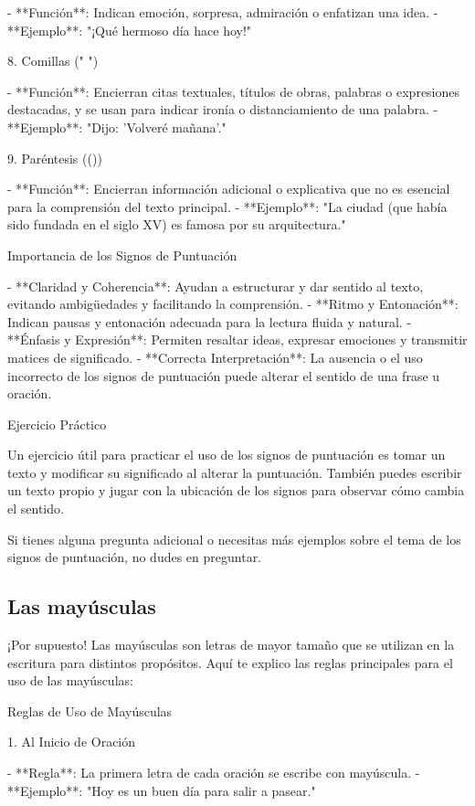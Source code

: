 - **Función**: Indican emoción, sorpresa, admiración o enfatizan una idea.
- **Ejemplo**: "¡Qué hermoso día hace hoy!"

8. Comillas (" ")

- **Función**: Encierran citas textuales, títulos de obras, palabras o expresiones destacadas, y se usan para indicar ironía o distanciamiento de una palabra.
- **Ejemplo**: "Dijo: 'Volveré mañana'."

9. Paréntesis (())

- **Función**: Encierran información adicional o explicativa que no es esencial para la comprensión del texto principal.
- **Ejemplo**: "La ciudad (que había sido fundada en el siglo XV) es famosa por su arquitectura."

Importancia de los Signos de Puntuación

- **Claridad y Coherencia**: Ayudan a estructurar y dar sentido al texto, evitando ambigüedades y facilitando la comprensión.
- **Ritmo y Entonación**: Indican pausas y entonación adecuada para la lectura fluida y natural.
- **Énfasis y Expresión**: Permiten resaltar ideas, expresar emociones y transmitir matices de significado.
- **Correcta Interpretación**: La ausencia o el uso incorrecto de los signos de puntuación puede alterar el sentido de una frase u oración.

Ejercicio Práctico

Un ejercicio útil para practicar el uso de los signos de puntuación es tomar un texto y modificar su significado al alterar la puntuación. También puedes escribir un texto propio y jugar con la ubicación de los signos para observar cómo cambia el sentido.

Si tienes alguna pregunta adicional o necesitas más ejemplos sobre el tema de los signos de puntuación, no dudes en preguntar.

\subsection{Las mayúsculas}

¡Por supuesto! Las mayúsculas son letras de mayor tamaño que se utilizan en la escritura para distintos propósitos. Aquí te explico las reglas principales para el uso de las mayúsculas:

Reglas de Uso de Mayúsculas

1. Al Inicio de Oración

- **Regla**: La primera letra de cada oración se escribe con mayúscula.
- **Ejemplo**: "Hoy es un buen día para salir a pasear."

